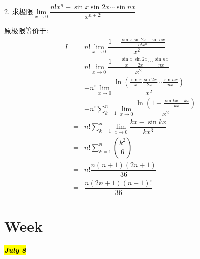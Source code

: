 2. 求极限$\lim\limits_{x\rightarrow 0}\dfrac{n!x^n-\sin x\sin 2x\cdots\sin nx}{x^{n+2}}$
\begin{solution}
	
	原极限等价于: 
	\begin{eqnarray*}
		I&=&n!\lim\limits_{x\rightarrow 0}\dfrac{1-\frac{\sin x\sin 2x\cdots\sin nx}{n!x^n}}{x^2}\\
		&=&n!\lim\limits_{x\rightarrow 0}\dfrac{1-\frac{\sin x}{x}\frac{\sin 2x}{2x}\cdots\frac{\sin nx}{nx}}{x^2}\\
		&=&-n!\lim\limits_{x\rightarrow 0}\dfrac{\ln(\frac{\sin x}{x}\frac{\sin 2x}{2x}\cdots\frac{\sin nx}{nx})}{x^2}\\
		&=&-n!\sum\limits_{k=1}^{n}\lim\limits_{x\rightarrow 0}\dfrac{\ln(1+\frac{\sin kx-kx}{kx})}{x^2}\\
		&=&n!\sum\limits_{k=1}^{n}\lim\limits_{x\rightarrow 0}\dfrac{kx-\sin kx}{kx^3}\\
		&=&n!\sum\limits_{k=1}^{n}(\dfrac{k^2}{6})\\
		&=&n!\dfrac{n(n+1)(2n+1)}{36}\\
		&=&\dfrac{n(2n+1)(n+1)!}{36}
	\end{eqnarray*}
\end{solution}

\section{Week }

\hl{\textbf{\textit{July 8}}}

